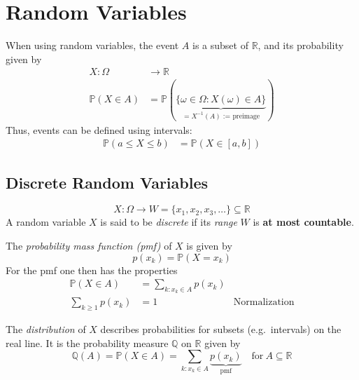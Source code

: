 \section{Random Variables}
When using random variables, the event $A$ is a subset of $\mathbb{R}$, and its probability given by
\noindent\begin{align*}
    X : \Omega         & \rightarrow \mathbb{R}                                                                       \\
    \mathbb{P}(X\in A) & =\mathbb{P}(\underbrace{\{\omega\in\Omega:X(\omega)\in A\}}_{=X^{-1}(A)\text{ := preimage}}) %
\end{align*}
Thus, events can be defined using intervals:
\noindent\begin{align*}
    \mathbb{P}(a\leq X\leq b) & =\mathbb{P}(X\in[a,b])
\end{align*}

\subsection{Discrete Random Variables}
\noindent\begin{equation*}
    X:\Omega\rightarrow W=\{x_1,x_2,x_3,\ldots\}\subseteq\mathbb{R}
\end{equation*}
A random variable $X$ is said to be \textit{discrete} if its \textit{range} $W$ is \textbf{at most countable}.
\newpar{}

The \textit{probability mass function (pmf)} of $X$ is given by
\begin{equation*}
    p(x_{k}) =\mathbb{P}(X=x_{k})
\end{equation*}
For the pmf one then has the properties
\noindent\begin{align*}
    \mathbb{P}(X\in A)  & =\sum_{k:x_k\in A}p(x_k)                        \\
    \sum_{k\geq1}p(x_k) & =1                       & \text{Normalization}
\end{align*}

\newpar{}

The \textit{distribution} of $X$ describes probabilities for subsets (e.g.\ intervals) on the real line. It is the probability measure $\mathbb{Q}$ on $\mathbb{R}$ given by
\noindent\begin{equation*}
    \mathbb{Q}(A)=\mathbb{P}(X\in A)=\sum_{k:x_k\in A} \underbrace{p(x_k)}_{\text{pmf}}\quad\mathrm{for~}A\subseteq\mathbb{R}
\end{equation*}

